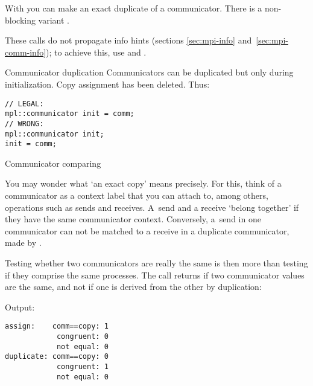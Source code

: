 
With  you can make an exact duplicate of a communicator.
There is a non-blocking variant .

These calls do not propagate info hints
(sections \ref{sec:mpi-info} and~\ref{sec:mpi-comm-info});
to achieve this,
use  and .

\begin{mplnote}{Communicator duplication}
  Communicators can be duplicated but only during initialization.
  Copy assignment has been deleted. Thus:
\begin{lstlisting}
// LEGAL: 
mpl::communicator init = comm;
// WRONG:
mpl::communicator init;
init = comm;
\end{lstlisting}
\end{mplnote}

 {Communicator comparing}
\label{sec:comm-compare}

You may wonder what `an exact copy' means precisely.
For this, think of a communicator as a context label that you can attach to,
among others, operations such as sends and receives.
A~send and a receive `belong together' if they have the same communicator context.
Conversely, a~send in one communicator can not be matched
to a receive in a duplicate communicator, made by .

Testing whether two communicators are really the same
is then more than testing if they comprise the same processes.
The call  returns 
if two communicator values are the same,
and not if one is derived from the other by duplication:
%
\begin{multicols}{2}
\columnbreak
Output:
\begin{verbatim}
assign:    comm==copy: 1
            congruent: 0
            not equal: 0
duplicate: comm==copy: 0
            congruent: 1
            not equal: 0
\end{verbatim}
\end{multicols}

